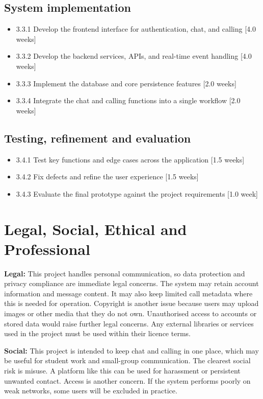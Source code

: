 \documentclass[12pt,a4paper]{article}
\begin{document}
\subsection{System implementation}
\begin{itemize}
    \item 3.3.1 Develop the frontend interface for authentication, chat, and calling [4.0 weeks]
    \item 3.3.2 Develop the backend services, APIs, and real-time event handling [4.0 weeks]
    \item 3.3.3 Implement the database and core persistence features [2.0 weeks]
    \item 3.3.4 Integrate the chat and calling functions into a single workflow [2.0 weeks]
\end{itemize}

\subsection{Testing, refinement and evaluation}
\begin{itemize}
    \item 3.4.1 Test key functions and edge cases across the application [1.5 weeks]
    \item 3.4.2 Fix defects and refine the user experience [1.5 weeks]
    \item 3.4.3 Evaluate the final prototype against the project requirements [1.0 week]
\end{itemize}

\section{Legal, Social, Ethical and Professional}
\textbf{Legal:} This project handles personal communication, so data protection and privacy compliance are immediate legal concerns. The system may retain account information and message content. It may also keep limited call metadata where this is needed for operation. Copyright is another issue because users may upload images or other media that they do not own. Unauthorised access to accounts or stored data would raise further legal concerns. Any external libraries or services used in the project must be used within their licence terms.

\textbf{Social:} This project is intended to keep chat and calling in one place, which may be useful for student work and small-group communication. The clearest social risk is misuse. A platform like this can be used for harassment or persistent unwanted contact. Access is another concern. If the system performs poorly on weak networks, some users will be excluded in practice.
\end{document}
